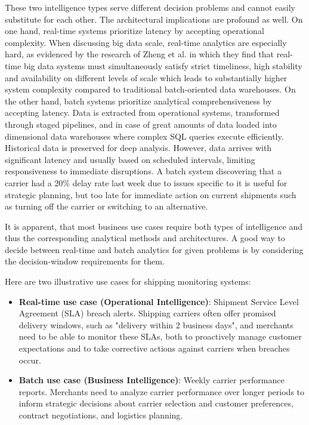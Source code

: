 \documentclass{imc-inf}
\begin{document}
These two intelligence types serve different decision problems and cannot easily substitute for each other.
The architectural implications are profound as well.
On one hand, real-time systems prioritize latency by accepting operational complexity. When discussing big data scale, real-time analytics are especially hard, as evidenced by the research of Zheng et al. \cite{zhengRealtimeBigData2025} in which they find that real-time big data systems must simultaneously satisfy strict timeliness, high stability and availability on different levels of scale which leads to substantially higher system complexity compared to traditional batch-oriented data warehouses.
On the other hand, batch systems prioritize analytical comprehensiveness by accepting latency. Data is extracted from operational systems, transformed through staged pipelines, and in case of great amounts of data loaded into dimensional data warehouses where complex SQL queries execute efficiently.
Historical data is preserved for deep analysis. However, data arrives with significant latency and usually based on scheduled intervals, limiting responsiveness to immediate disruptions.
A batch system discovering that a carrier had a 20\% delay rate last week due to issues specific to it is useful for strategic planning, but too late for immediate action on current shipments such as turning off the carrier or switching to an alternative.

It is apparent, that most business use cases require both types of intelligence and thus the corresponding analytical methods and architectures.
A good way to decide between real-time and batch analytics for given problems is by considering the decision-window requirements for them.

Here are two illustrative use cases for shipping monitoring systems:

\begin{itemize}[itemsep=3pt]
  \item\textbf{Real-time use case (Operational Intelligence)}: Shipment Service Level Agreement (SLA) breach alerts. Shipping carriers often offer promised delivery windows, such as "delivery within 2 business days", and merchants need to be able to monitor these SLAs, both to proactively manage customer expectations and to take corrective actions against carriers when breaches occur.
  \item\textbf{Batch use case (Business Intelligence)}: Weekly carrier performance reports. Merchants need to analyze carrier performance over longer periods to inform strategic decisions about carrier selection and customer preferences, contract negotiations, and logistics planning.
\end{itemize}
\end{document}
